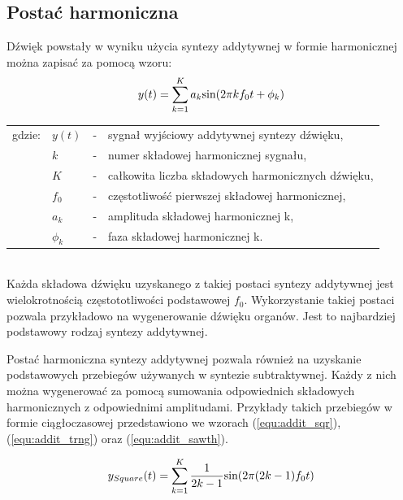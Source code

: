 \subsection{Postać harmoniczna} \label{pos_harm}
Dźwięk powstały w wyniku użycia syntezy addytywnej w formie harmonicznej można zapisać za pomocą wzoru:
\begin{equation} \label{equ:addit_time_harm}
y(t) = \sum_{k=1}^{K} a_{k}\text{sin}(2\pi kf_{0}t + \phi_{k})  \\  
\end{equation}
\begin{tabular}{ l l l l}
	gdzie: & $y(t)$ &  - & sygnał wyjściowy addytywnej syntezy dźwięku, \\
	&	$k$ & - &  numer składowej harmonicznej sygnału, \\
	&	$K$ & - &  całkowita liczba składowych harmonicznych dźwięku,\\
	&	$f_{0}$ & - &  częstotliwość pierwszej składowej harmonicznej,\\
	&	$a_{k}$ & - &  amplituda składowej harmonicznej k, \\
	&	$\phi_{k}$ & - &  faza składowej harmonicznej k. \\
\end{tabular} \\

Każda składowa dźwięku uzyskanego z takiej postaci syntezy addytywnej jest wielokrotnością częstototliwości podstawowej $f_{0}$. Wykorzystanie takiej postaci pozwala przykładowo na wygenerowanie dźwięku organów. Jest to najbardziej podstawowy rodzaj syntezy addytywnej.


Postać harmoniczna syntezy addytywnej pozwala również na uzyskanie podstawowych przebiegów używanych w syntezie subtraktywnej. Każdy z nich można wygenerować za pomocą sumowania odpowiednich składowych harmonicznych z odpowiednimi amplitudami. Przykłady takich przebiegów w formie ciągłoczasowej przedstawiono we wzorach (\ref{equ:addit_sqr}), (\ref{equ:addit_trng}) oraz (\ref{equ:addit_sawth}).

\begin{equation} \label{equ:addit_sqr}
y_{Square}(t) = \sum_{k=1}^{K} \frac{1}{2k-1} \text{sin}(2\pi (2k-1)f_{0}t) \\
\end{equation}


